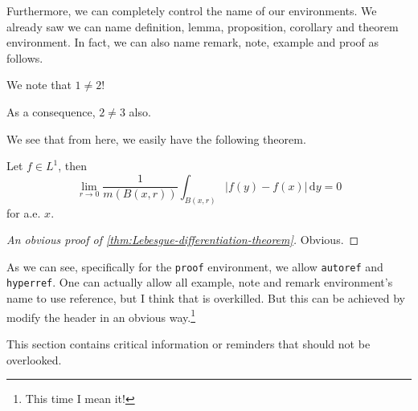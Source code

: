 Furthermore, we can completely control the name of our environments. We already saw we can name definition, lemma, proposition, corollary and theorem environment. In fact, we can also name remark, note, example and proof as follows.
\begin{es}\label{eg}
  We note that \(1 \neq 2\)!
  \begin{nota}
    As a consequence, \(2 \neq 3\) also.
  \end{nota}

  \begin{osservazione}
    We see that from here, we easily have the following theorem.
    \begin{teorema}\label{thm:Lebesgue-differentiation-theorem}
      Let \(f\in L^1\), then
      \[
        \lim\limits_{r \to 0} \frac{1}{m(B(x, r))}\int_{B(x, r)}\left\vert f(y) - f(x) \right\vert   \,\mathrm{d}y = 0
      \]
      for a.e. \(x\).
    \end{teorema}
    \begin{proof}[An obvious proof of \autoref{thm:Lebesgue-differentiation-theorem}]
      Obvious.
    \end{proof}
  \end{osservazione}
\end{es}
As we can see, specifically for the \texttt{proof} environment, we allow \texttt{autoref} and \texttt{hyperref}. One can actually allow all example, note and remark environment's name to use reference, but I think that is overkilled. But this can be achieved by modify the header in an obvious way.\footnote{This time I mean it!}

\begin{attenzione}
  This section contains critical information or reminders that should not be overlooked.
\end{attenzione}